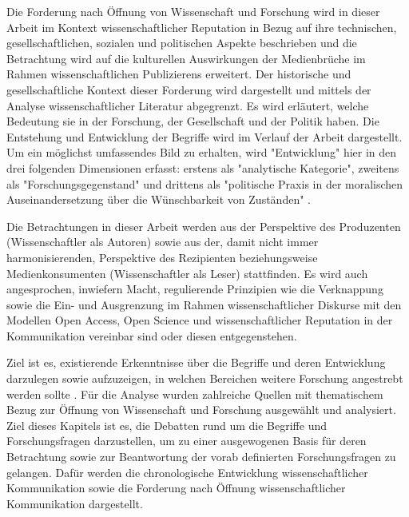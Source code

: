 Die Forderung nach Öffnung von Wissenschaft und Forschung wird in dieser Arbeit im Kontext wissenschaftlicher Reputation in Bezug auf ihre technischen, gesellschaftlichen, sozialen und politischen Aspekte beschrieben und die Betrachtung wird auf die kulturellen Auswirkungen der Medienbrüche im Rahmen wissenschaftlichen Publizierens erweitert. Der historische und gesellschaftliche Kontext dieser Forderung wird dargestellt und mittels der Analyse wissenschaftlicher Literatur abgegrenzt. Es wird erläutert, welche Bedeutung sie in der Forschung, der Gesellschaft und der Politik haben. Die Entstehung und Entwicklung der Begriffe wird im Verlauf der Arbeit dargestellt. Um ein möglichst umfassendes Bild zu erhalten, wird "Entwicklung" hier in den drei folgenden Dimensionen erfasst: erstens als "analytische Kategorie", zweitens als "Forschungsgegenstand" und drittens als "politische Praxis in der moralischen Auseinandersetzung über die Wünschbarkeit von Zuständen" \cite{Bierschenk_2014}.

Die Betrachtungen in dieser Arbeit werden aus der Perspektive des Produzenten (Wissenschaftler als Autoren) sowie aus der, damit nicht immer harmonisierenden, Perspektive des Rezipienten beziehungsweise Medienkonsumenten (Wissenschaftler als Leser) stattfinden. Es wird auch angesprochen, inwiefern Macht, regulierende Prinzipien wie die Verknappung sowie die Ein- und Ausgrenzung im Rahmen wissenschaftlicher Diskurse mit den Modellen Open Access, Open Science und wissenschaftlicher Reputation in der Kommunikation vereinbar sind oder diesen entgegenstehen.

Ziel ist es, existierende Erkenntnisse über die Begriffe und deren Entwicklung darzulegen sowie aufzuzeigen, in welchen Bereichen weitere Forschung angestrebt werden sollte \cite{Webster_2002}. Für die Analyse wurden zahlreiche Quellen mit thematischem Bezug zur Öffnung von Wissenschaft und Forschung ausgewählt und analysiert. Ziel dieses Kapitels ist es, die Debatten rund um die Begriffe und Forschungsfragen darzustellen, um zu einer ausgewogenen Basis für deren Betrachtung sowie zur Beantwortung der vorab definierten Forschungsfragen zu gelangen. Dafür werden die chronologische Entwicklung wissenschaftlicher Kommunikation sowie die Forderung nach Öffnung wissenschaftlicher Kommunikation dargestellt.

